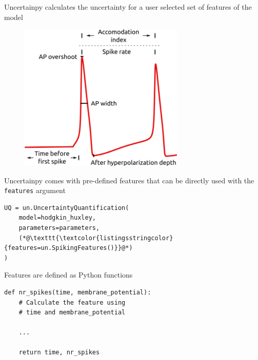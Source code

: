 \documentclass[presentation]{beamer}
\begin{document}

\begin{frame}{Uncertainpy calculates the uncertainty for a user selected set of
              features of the model}
  \vspace{-5mm}
  \begin{figure}
      \includegraphics[width=0.7\textwidth]{features.png}
  \end{figure}
  \end{frame}





\begin{frame}[fragile]{Uncertainpy comes with pre-defined features that can be
  directly used with the \lstinline|features| argument}

  \begin{lstlisting}
UQ = un.UncertaintyQuantification(
    model=hodgkin_huxley,
    parameters=parameters,
    (*@\texttt{\textcolor{listingsstringcolor}{features=un.SpikingFeatures()}}@*)
)
  \end{lstlisting}


\end{frame}




\begin{frame}[fragile]{Features are defined as Python functions}

  \begin{lstlisting}
def nr_spikes(time, membrane_potential):
    # Calculate the feature using
    # time and membrane_potential

    ...

    return time, nr_spikes
  \end{lstlisting}

\end{frame}
\end{document}
